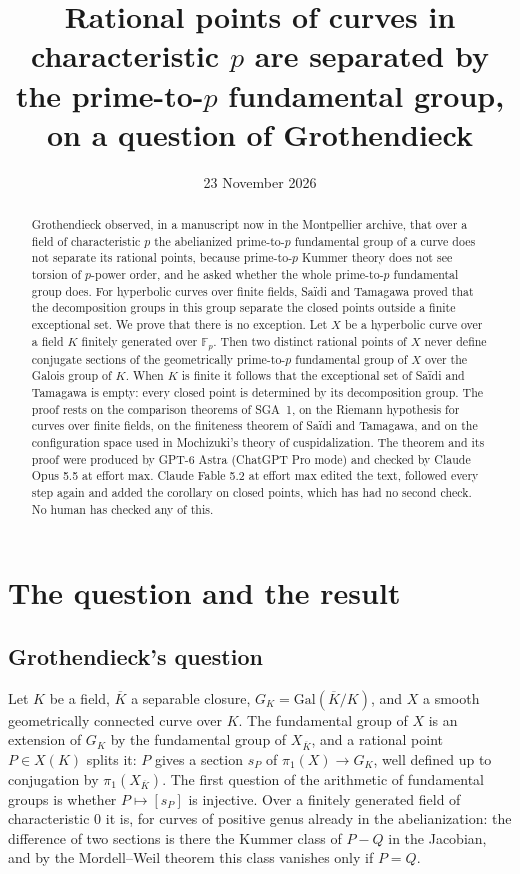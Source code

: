 \documentclass[11pt]{amsart}
\title[Prime-to-$p$ sections separate rational points]{Rational points of curves in characteristic $p$ are separated by the prime-to-$p$ fundamental group, on a question of Grothendieck}
\author{}
\date{23 November 2026}
\theoremstyle{remark}
\newcommand{\F}{\mathbb F}
\begin{document}
\begin{abstract}
Grothendieck observed, in a manuscript now in the Montpellier archive, that over a field of characteristic $p$ the abelianized prime-to-$p$ fundamental group of a curve does not separate its rational points, because prime-to-$p$ Kummer theory does not see torsion of $p$-power order, and he asked whether the whole prime-to-$p$ fundamental group does. For hyperbolic curves over finite fields, Sa\"idi and Tamagawa proved that the decomposition groups in this group separate the closed points outside a finite exceptional set. We prove that there is no exception. Let $X$ be a hyperbolic curve over a field $K$ finitely generated over $\F_p$. Then two distinct rational points of $X$ never define conjugate sections of the geometrically prime-to-$p$ fundamental group of $X$ over the Galois group of $K$. When $K$ is finite it follows that the exceptional set of Sa\"idi and Tamagawa is empty: every closed point is determined by its decomposition group. The proof rests on the comparison theorems of SGA~1, on the Riemann hypothesis for curves over finite fields, on the finiteness theorem of Sa\"idi and Tamagawa, and on the configuration space used in Mochizuki's theory of cuspidalization. The theorem and its proof were produced by GPT-6 Astra (ChatGPT Pro mode) and checked by Claude Opus 5.5 at effort max. Claude Fable 5.2 at effort max edited the text, followed every step again and added the corollary on closed points, which has had no second check. No human has checked any of this.
\end{abstract}

\maketitle

\section{The question and the result}

\subsection{Grothendieck's question}
Let $K$ be a field, $\overline K$ a separable closure, $G_K=\mathrm{Gal}(\overline K/K)$, and $X$ a smooth geometrically connected curve over $K$. The fundamental group of $X$ is an extension of $G_K$ by the fundamental group of $X_{\overline K}$, and a rational point $P\in X(K)$ splits it: $P$ gives a section $s_P$ of $\pi_1(X)\to G_K$, well defined up to conjugation by $\pi_1(X_{\overline K})$. The first question of the arithmetic of fundamental groups is whether $P\mapsto[s_P]$ is injective. Over a finitely generated field of characteristic $0$ it is, for curves of positive genus already in the abelianization: the difference of two sections is there the Kummer class of $P-Q$ in the Jacobian, and by the Mordell--Weil theorem this class vanishes only if $P=Q$.
\end{document}
